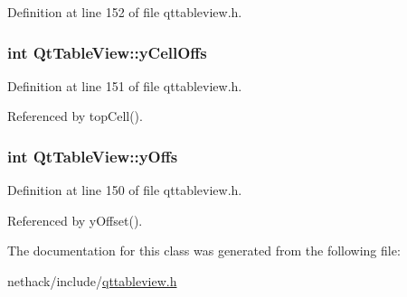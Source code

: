 Definition at line 152 of file qttableview.\+h.

\hypertarget{classQtTableView_ad86e5f371dbc42a44aa6df5c95957c58}{
\subsubsection[{y\+Cell\+Offs}]{\setlength{\rightskip}{0pt plus 5cm}int Qt\+Table\+View\+::y\+Cell\+Offs\hspace{0.3cm}{\ttfamily [private]}}}\label{classQtTableView_ad86e5f371dbc42a44aa6df5c95957c58}


Definition at line 151 of file qttableview.\+h.



Referenced by top\+Cell().

\hypertarget{classQtTableView_a2ed1f90a440c78dddcd475bb6e56fe30}{
\subsubsection[{y\+Offs}]{\setlength{\rightskip}{0pt plus 5cm}int Qt\+Table\+View\+::y\+Offs\hspace{0.3cm}{\ttfamily [private]}}}\label{classQtTableView_a2ed1f90a440c78dddcd475bb6e56fe30}


Definition at line 150 of file qttableview.\+h.



Referenced by y\+Offset().



The documentation for this class was generated from the following file\+:\begin{DoxyCompactItemize}
\item 
nethack/include/\hyperlink{qttableview_8h}{qttableview.\+h}\end{DoxyCompactItemize}
